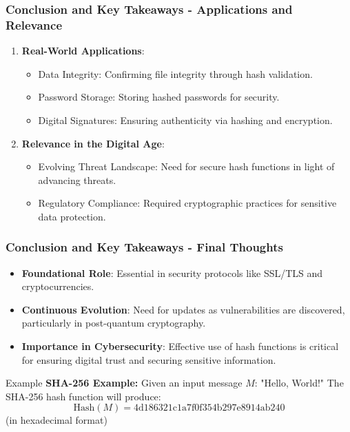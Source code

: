 \documentclass{beamer}
\begin{document}
\begin{frame}[fragile]
    \frametitle{Conclusion and Key Takeaways - Applications and Relevance}
    \begin{enumerate}
        \item \textbf{Real-World Applications}:
        \begin{itemize}
            \item Data Integrity: Confirming file integrity through hash validation.
            \item Password Storage: Storing hashed passwords for security.
            \item Digital Signatures: Ensuring authenticity via hashing and encryption.
        \end{itemize}
        \item \textbf{Relevance in the Digital Age}:
        \begin{itemize}
            \item Evolving Threat Landscape: Need for secure hash functions in light of advancing threats.
            \item Regulatory Compliance: Required cryptographic practices for sensitive data protection.
        \end{itemize}
    \end{enumerate}
\end{frame}

\begin{frame}[fragile]
    \frametitle{Conclusion and Key Takeaways - Final Thoughts}
    \begin{itemize}
        \item \textbf{Foundational Role}: Essential in security protocols like SSL/TLS and cryptocurrencies.
        \item \textbf{Continuous Evolution}: Need for updates as vulnerabilities are discovered, particularly in post-quantum cryptography.
        \item \textbf{Importance in Cybersecurity}: Effective use of hash functions is critical for ensuring digital trust and securing sensitive information.
    \end{itemize}
    \begin{block}{Example}
        \textbf{SHA-256 Example:}
        Given an input message \( M \): "Hello, World!"  
        The SHA-256 hash function will produce:
        \begin{equation}
            \text{Hash}(M) = \text{4d186321c1a7f0f354b297e8914ab240}
        \end{equation}
        (in hexadecimal format)
    \end{block}
\end{frame}
\end{document}
